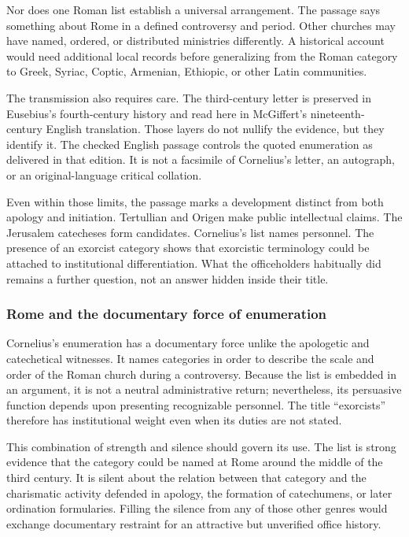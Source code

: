 Nor does one Roman list establish a universal arrangement. The passage says
something about Rome in a defined controversy and period. Other churches may
have named, ordered, or distributed ministries differently. A historical
account would need additional local records before generalizing from the Roman
category to Greek, Syriac, Coptic, Armenian, Ethiopic, or other Latin
communities.

The transmission also requires care. The third-century letter is preserved in
Eusebius's fourth-century history and read here in McGiffert's nineteenth-
century English translation. Those layers do not nullify the evidence, but
they identify it. The checked English passage controls the quoted enumeration
as delivered in that edition. It is not a facsimile of Cornelius's letter, an
autograph, or an original-language critical collation.

Even within those limits, the passage marks a development distinct from both
apology and initiation. Tertullian and Origen make public intellectual claims.
The Jerusalem catecheses form candidates. Cornelius's list names personnel.
The presence of an exorcist category shows that exorcistic terminology could
be attached to institutional differentiation. What the officeholders
habitually did remains a further question, not an answer hidden inside their
title.

\subsubsection{Rome and the documentary force of enumeration}

Cornelius's enumeration has a documentary force unlike the apologetic and
catechetical witnesses. It names categories in order to describe the scale and
order of the Roman church during a controversy. Because the list is embedded
in an argument, it is not a neutral administrative return; nevertheless, its
persuasive function depends upon presenting recognizable personnel. The title
``exorcists'' therefore has institutional weight even when its duties are not
stated.

This combination of strength and silence should govern its use. The list is
strong evidence that the category could be named at Rome around the middle of
the third century. It is silent about the relation between that category and
the charismatic activity defended in apology, the formation of catechumens,
or later ordination formularies. Filling the silence from any of those other
genres would exchange documentary restraint for an attractive but unverified
office history.

